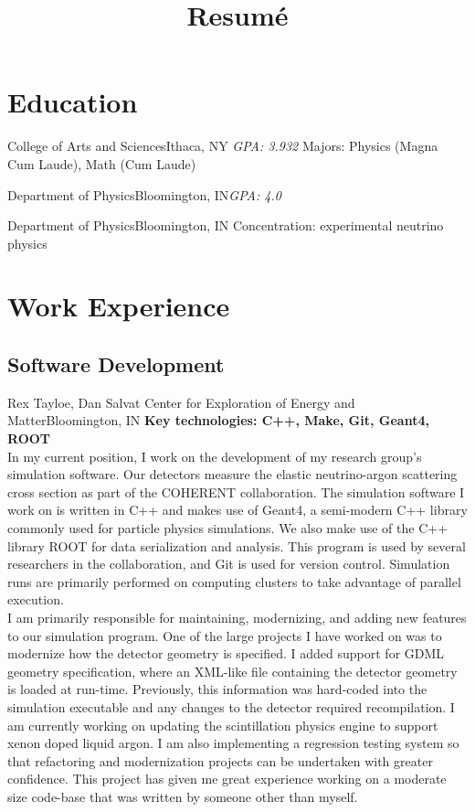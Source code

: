 \documentclass[11pt,a4paper,sans]{moderncv}        %
\title{Resumé}
\newcommand{\techlist}[1]{\textbf{Key technologies: {#1}}\\}
\begin{document}
\makecvtitle

\section{Education}
{College of Arts and Sciences}{Ithaca, NY}
{\textit{GPA: 3.932}}
{Majors: Physics (Magna Cum Laude), Math (Cum Laude)}

{Department of Physics}{Bloomington, IN}{\textit{GPA: 4.0}}{}

{Department of Physics}{Bloomington, IN}{}
{Concentration: experimental neutrino physics}


\section{Work Experience}
\subsection{Software Development}
{Rex Tayloe, Dan Salvat}
{Center for Exploration of Energy and Matter}{Bloomington, IN}{
\techlist{C++, Make, Git, Geant4, ROOT}
In my current position, I work on the development of my research group's simulation software.
Our detectors measure the elastic neutrino-argon scattering cross section as part of the COHERENT collaboration.
The simulation software I work on is written in C++ and makes use of Geant4, a semi-modern C++ library commonly used for particle physics simulations.
We also make use of the C++ library ROOT for data serialization and analysis.
This program is used by several researchers in the collaboration, and Git is used for version control.
Simulation runs are primarily performed on computing clusters to take advantage of parallel execution.
\\
I am primarily responsible for maintaining, modernizing, and adding new features to our simulation program.
One of the large projects I have worked on was to modernize how the detector geometry is specified.
I added support for GDML geometry specification, where an XML-like file containing the detector geometry is loaded at run-time.
Previously, this information was hard-coded into the simulation executable and any changes to the detector required recompilation.
I am currently working on updating the scintillation physics engine to support xenon doped liquid argon.
I am also implementing a regression testing system so that refactoring and modernization projects can be undertaken with greater confidence.
This project has given me great experience working on a moderate size code-base that was written by someone other than myself.
}%
\end{document}
